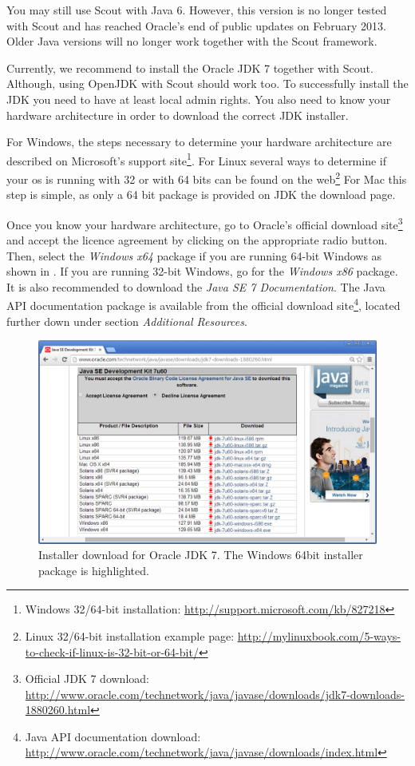 \documentclass[a4paper,10pt,twoside]{book}
\begin{document}
You may still use Scout with Java 6.
However, this version is no longer tested with Scout and has reached Oracle's end of public updates on February 2013.
Older Java versions will no longer work together with the Scout framework. 

Currently, we recommend to install the Oracle JDK 7 together with Scout. Although, using OpenJDK with Scout should work too. 
To successfully install the JDK you need to have at least local admin rights.
You also need to know your hardware architecture in order to download the correct JDK installer. 

For Windows, the steps necessary to determine your hardware architecture are described on Microsoft's support 
site\footnote{
Windows 32/64-bit installation: \url{http://support.microsoft.com/kb/827218}
}.
For Linux several ways to determine if your os is running with 32 or with 64 bits can be found on the web\footnote{
Linux 32/64-bit installation example page: \url{http://mylinuxbook.com/5-ways-to-check-if-linux-is-32-bit-or-64-bit/}
}
For Mac this step is simple, as only a 64 bit package is provided on JDK the download page.

Once you know your hardware architecture, go to Oracle's official download 
site\footnote{
Official JDK 7 download: \url{http://www.oracle.com/technetwork/java/javase/downloads/jdk7-downloads-1880260.html}
} 
and accept the licence agreement by clicking on the appropriate radio button.
Then, select the \textit{Windows x64} package if you are running 64-bit Windows as shown in .
If you are running 32-bit Windows, go for the \textit{Windows x86} package.
It is also recommended to download the \textit{Java SE 7 Documentation}.
The Java API documentation package is available from the official download site\footnote{
Java API documentation download: \url{http://www.oracle.com/technetwork/java/javase/downloads/index.html}
}, located further down under section \textit{Additional Resources}.

\begin{figure}
\includegraphics[width=15cm]{oracle_jdk_download.png}
\caption{Installer download for Oracle JDK 7. The Windows 64bit installer package is highlighted.}
\end{figure}
\end{document}
